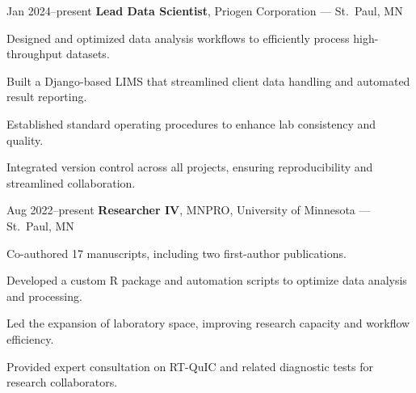 \documentclass{resume}
\begin{document}
        \begin{twocolentry}{Jan 2024--present}
            \textbf{Lead Data Scientist}, Priogen Corporation --- St.\ Paul, MN
        \end{twocolentry}
        \begin{onecolentry}
            \begin{highlights}
                \item Designed and optimized data analysis workflows to efficiently process high-throughput datasets.
                \item Built a Django-based LIMS that streamlined client data handling and automated result reporting.
                \item Established standard operating procedures to enhance lab consistency and quality.
                \item Integrated version control across all projects, ensuring reproducibility and streamlined collaboration.
            \end{highlights}
        \end{onecolentry}

        \begin{twocolentry}{Aug 2022--present}
            \textbf{Researcher IV}, MNPRO, University of Minnesota --- St.\ Paul, MN
        \end{twocolentry}
        \begin{onecolentry}
            \begin{highlights}
                \item Co-authored 17 manuscripts, including two first-author publications.
                \item Developed a custom R package and automation scripts to optimize data analysis and processing.
                \item Led the expansion of laboratory space, improving research capacity and workflow efficiency.
                \item Provided expert consultation on RT-QuIC and related diagnostic tests for research collaborators.
            \end{highlights}
        \end{onecolentry}
\end{document}
